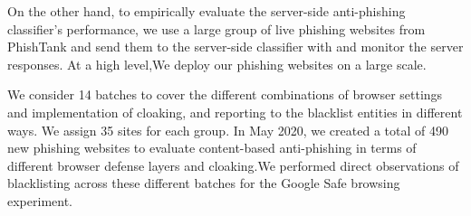 \begin{table}
\centering
{}
\caption{Blacklisting evaluation metrics~\cite{oest2020phishtime}}
\label{tab:Blacklisting metrics}
\end{table}

On the other hand, to empirically evaluate the server-side anti-phishing classifier's performance, we use a large group of live phishing websites from PhishTank and send them to the server-side classifier with and monitor the server responses.
At a high level,We deploy our phishing websites on a large scale. 

We consider 14 batches to cover the different combinations of browser settings and implementation of cloaking, and reporting to the blacklist entities in different ways. We assign 35 sites for each group. In May 2020, we created a total of 490 new phishing websites to evaluate content-based anti-phishing in terms of different browser defense layers and cloaking.We performed direct observations of blacklisting across these different batches for the Google Safe browsing experiment. 

